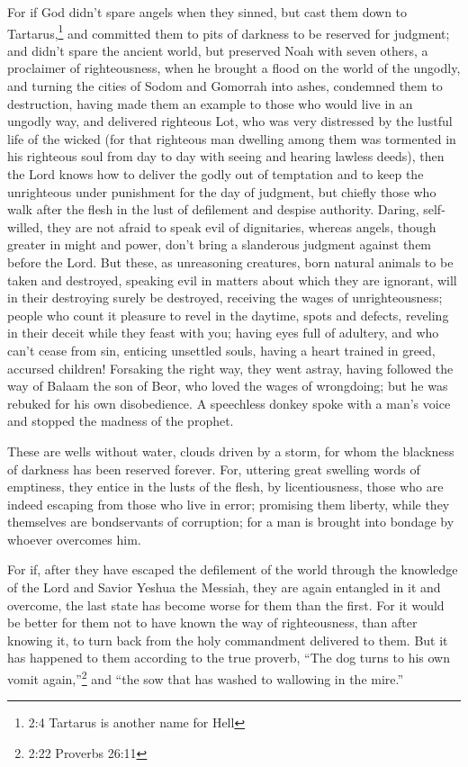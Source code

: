 \myverse{}For if God didn’t spare angels when they sinned, but cast them
down to Tartarus,\footnote{2:4 Tartarus is another name for Hell} and committed them to pits of darkness to be reserved
for judgment;
\myverse{}and didn’t spare the ancient world, but preserved Noah with seven others, a
proclaimer of righteousness, when he brought a flood on the world of the ungodly,
\myverse{}and turning the cities of Sodom and Gomorrah into ashes, condemned them to destruction,
having made them an example to those who would live in an ungodly way,
\myverse{}and delivered righteous Lot, who was very distressed by the lustful life of
the wicked
\myverse{}(for that righteous man dwelling among them was tormented in his righteous soul
from day to day with seeing and hearing lawless deeds),
\myverse{}then the Lord knows how to deliver the godly out of temptation and to keep the
unrighteous under punishment for the day of judgment,
\myverse{}but chiefly those who walk after the flesh in the lust of defilement and despise
authority. Daring, self-willed, they are not afraid to speak evil of dignitaries,
\myverse{}whereas angels, though greater in might and power, don’t bring a slanderous
judgment against them before the Lord.
\myverse{}But these, as unreasoning creatures, born natural animals to be taken and
destroyed, speaking evil in matters about which they are ignorant, will in their destroying surely be
destroyed,
\myverse{}receiving the wages of unrighteousness; people who count it pleasure to revel
in the daytime, spots and defects, reveling in their deceit while they feast with you;
\myverse{}having eyes full of adultery, and who can’t cease from sin, enticing unsettled
souls, having a heart trained in greed, accursed children!
\myverse{}Forsaking the right way, they went astray, having followed the way of Balaam
the son of Beor, who loved the wages of wrongdoing;
\myverse{}but he was rebuked for his own disobedience. A speechless donkey spoke with
a man’s voice and stopped the madness of the prophet.

\myverse{}These are wells without water, clouds driven by a storm, for
whom the blackness of darkness has been reserved forever.
\myverse{}For, uttering great swelling words of emptiness, they entice in the lusts
of the flesh, by licentiousness, those who are indeed escaping from those who live in error;
\myverse{}promising them liberty, while they themselves are bondservants of corruption;
for a man is brought into bondage by whoever overcomes him.

\myverse{}For if, after they have escaped the defilement of the world through
the knowledge of the Lord and Savior Yeshua the Messiah, they are again entangled in it and overcome,
the last state has become worse for them than the first.
\myverse{}For it would be better for them not to have known the way of righteousness,
than after knowing it, to turn back from the holy commandment delivered to them.
\myverse{}But it has happened to them according to the true proverb, “The dog turns
to his own vomit again,”\footnote{2:22 Proverbs 26:11} and “the sow that has washed to wallowing
in the mire.”


